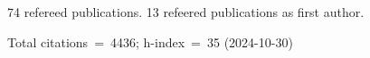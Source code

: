 74 refereed publications. 13 refeered publications as first author.

Total citations~=~4436; h-index~=~35 (2024-10-30)